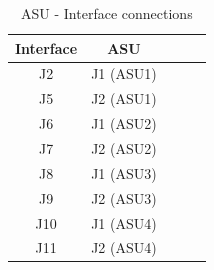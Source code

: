 \begin{table}[H]
  \centering \bgroup
  \def\arraystretch{1.5}%
  \begin{tabular}{|c|c|c|c|c|}
    \hline
    \textbf{Interface} & \textbf{ASU} \\
    \hline
    J2 & J1 (ASU1)  \\
    \hline
    J5 & J2 (ASU1)  \\
    \hline
    J6 & J1 (ASU2)  \\
    \hline
    J7 & J2 (ASU2)  \\
    \hline
    J8 & J1 (ASU3)  \\
    \hline
    J9 & J2 (ASU3)  \\
    \hline
    J10 & J1 (ASU4)  \\
    \hline
    J11 & J2 (ASU4)  \\
    \hline
  \end{tabular}
  \egroup
  \caption{ASU - Interface connections}\label{tab:ASU-IF}
\end{table}

